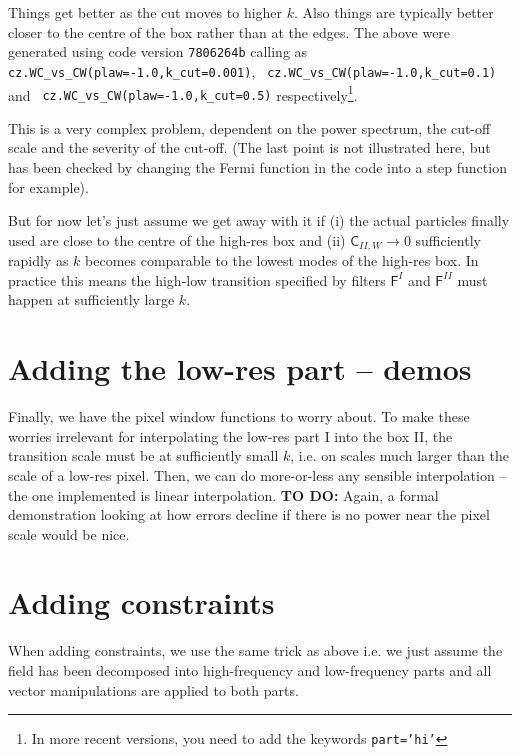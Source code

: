\documentclass[11pt,a4paper,preprint]{aastex}
\begin{document}
Things get better as the cut moves to higher $k$. Also things are
typically better closer to the centre of the box rather than at the
edges.  The above were generated using code version {\tt 7806264b}
calling as {\tt cz.WC\_vs\_CW(plaw=-1.0,k\_cut=0.001)}, {\tt
  cz.WC\_vs\_CW(plaw=-1.0,k\_cut=0.1)} and {\tt
  cz.WC\_vs\_CW(plaw=-1.0,k\_cut=0.5)} respectively\footnote{In more recent
  versions, you need to add the keywords {\tt part='hi'}}.

This is a very complex problem, dependent on the power spectrum, the
cut-off scale and the severity of the cut-off. (The last point is not
illustrated here, but has been checked by changing the Fermi function
in the code into a step function for example).

But for now let's just assume we get
away with it if (i) the actual particles finally used are close to the
centre of the high-res box and (ii) $\mathsf{C}_{II,W} \to 0$
sufficiently rapidly as $k$ becomes comparable to the lowest modes of
the high-res box. In practice this means the high-low transition
specified by filters $\mathsf{F}^I$ and $\mathsf{F}^{II}$ must happen
at sufficiently large $k$.



\section{Adding the low-res part -- demos}

Finally, we have the pixel window functions to worry about. To make
these worries irrelevant for interpolating the low-res part I into the
box II, the transition scale must be at sufficiently small $k$,
i.e. on scales much larger than the scale of a low-res pixel.  Then,
we can do more-or-less any sensible interpolation -- the one
implemented is linear interpolation. {\bf TO DO: } Again, a formal
demonstration looking at how errors decline if there is no power near
the pixel scale would be nice.

\section{Adding constraints}

When adding constraints, we use the same trick as above i.e. we just assume
the field has been decomposed into high-frequency and low-frequency parts and
all vector manipulations are applied to both parts.
\end{document}
